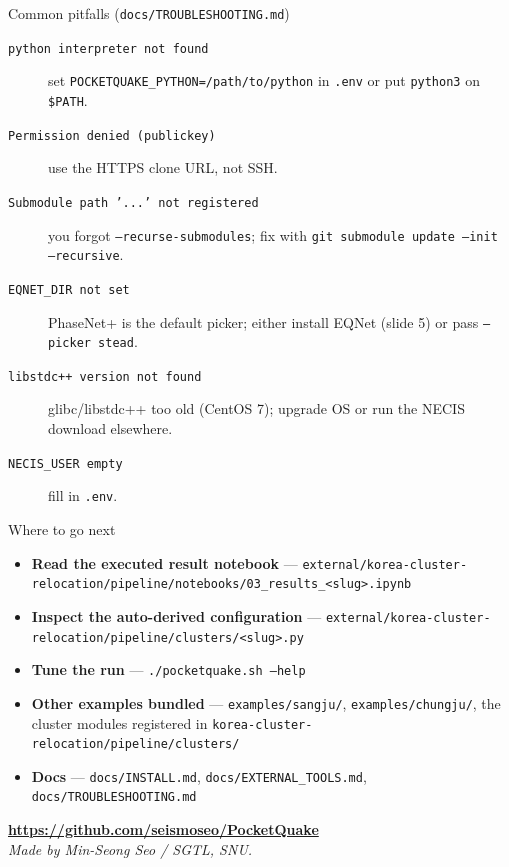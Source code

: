 \documentclass[10pt,aspectratio=169]{beamer}
\begin{document}
\begin{frame}[fragile]{Common pitfalls (\texttt{docs/TROUBLESHOOTING.md})}
\begin{description}
  \item[\texttt{python interpreter not found}] set
        \texttt{POCKETQUAKE\_PYTHON=/path/to/python} in \texttt{.env}
        or put \texttt{python3} on \texttt{\$PATH}.
  \item[\texttt{Permission denied (publickey)}] use the HTTPS clone URL,
        not SSH.
  \item[\texttt{Submodule path '...' not registered}] you forgot
        \texttt{--recurse-submodules}; fix with
        \texttt{git submodule update --init --recursive}.
  \item[\texttt{EQNET\_DIR not set}] PhaseNet+ is the default picker;
        either install EQNet (slide 5) or pass \texttt{--picker stead}.
  \item[\texttt{libstdc++ version not found}] glibc/libstdc++ too old
        (CentOS 7); upgrade OS or run the NECIS download elsewhere.
  \item[\texttt{NECIS\_USER empty}] fill in \texttt{.env}.
\end{description}
\end{frame}

\begin{frame}{Where to go next}
\begin{itemize}
  \item \textbf{Read the executed result notebook} ---
        \texttt{external/korea-cluster-relocation/pipeline/notebooks/03\_results\_<slug>.ipynb}
  \item \textbf{Inspect the auto-derived configuration} ---
        \texttt{external/korea-cluster-relocation/pipeline/clusters/<slug>.py}
  \item \textbf{Tune the run} --- \texttt{./pocketquake.sh --help}
  \item \textbf{Other examples bundled} --- \texttt{examples/sangju/},
        \texttt{examples/chungju/}, the cluster modules registered in
        \texttt{korea-cluster-relocation/pipeline/clusters/}
  \item \textbf{Docs} --- \texttt{docs/INSTALL.md},
        \texttt{docs/EXTERNAL\_TOOLS.md},
        \texttt{docs/TROUBLESHOOTING.md}
\end{itemize}
\vspace{1em}
\centering
\textbf{\url{https://github.com/seismoseo/PocketQuake}} \\
\smallskip
\textit{Made by Min-Seong Seo / SGTL, SNU.}
\end{frame}
\end{document}
